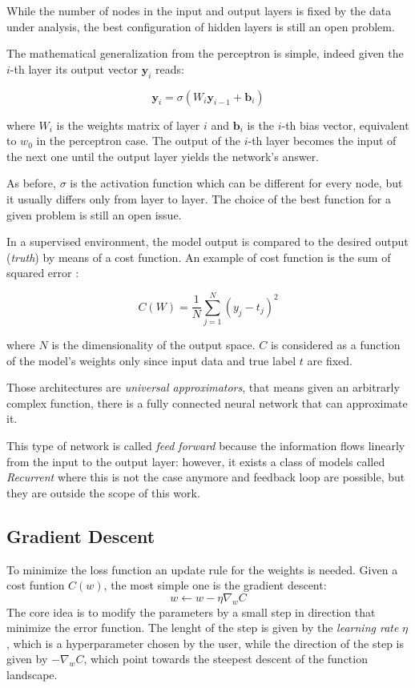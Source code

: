 \documentclass[12pt,a4paper]{report}
\begin{document}
While the number of nodes in the input and output layers is fixed by the data under analysis, the best configuration of hidden layers is still an open problem.

The mathematical generalization from the perceptron is simple, indeed given the $i$-th layer its output vector $\bm{y}_i$ reads:  

\begin{equation}
 \bm{y}_i = \sigma(W_i \bm{y}_{i-1} + \bm{b}_i)
\end{equation}

where $W_i$ is the weights matrix of layer $i$ and $\bm{b}_i$ is the $i$-th bias vector, equivalent to $w_0$ in the perceptron case.
The output of the $i$-th layer becomes the input of the next one until the output layer yields the network's answer. 

As before, $\sigma$ is the activation function which can be different for every node, but it usually differs only from layer to layer. 
The choice of the best function for a given problem is still an open issue.

In a supervised environment, the model output is compared to the desired output ({\it truth}) by means of a cost function. 
An example of cost function is the sum of squared error : 

\begin{equation}
  C(W) = \frac{1}{N} \sum_{j=1}^{N} (y_j - t_j)^2
\end{equation}

where $N$ is the dimensionality of the output space. $C$ is considered as a function of the model's weights only since input data and true label $t$ are fixed.

Those architectures are {\it universal approximators}, that means given an arbitrarly complex function, there is a fully connected neural network that can approximate it.

This type of network is called {\it feed forward} because the information flows linearly from the input to the output layer: however, it exists a class of models called {\it Recurrent} where this is not the case anymore and feedback loop are possible, but they are outside the scope of this work. 

\subsection*{Gradient Descent}

To minimize the loss function an update rule for the weights is needed. 
Given a cost funtion $C(w)$, the most simple one is the gradient descent:
\begin{equation}
 w \leftarrow w - \eta \nabla_w C
\end{equation}
The core idea is to modify the parameters by a small step in direction that minimize the error function. 
The lenght of the step is given by the {\it learning rate} $\eta$, which is a hyperparameter chosen by the user, while the direction of the step is given by $-\nabla_w C$, which point towards the steepest descent of the function landscape.
\end{document}
